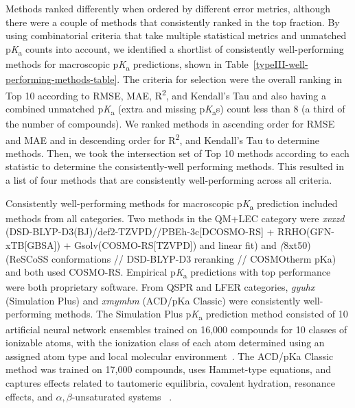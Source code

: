 \documentclass[9pt,lineno,final]{elife}
\newcommand{\pKa}{p\textit{K}\textsubscript{a}}
\begin{document}
Methods ranked differently when ordered by different error metrics, although there were a couple of methods that consistently ranked in the top fraction. 
By using combinatorial criteria that take multiple statistical metrics and unmatched \pKa{} counts into account, we identified a shortlist of consistently well-performing methods for macroscopic \pKa{} predictions, shown in Table~\ref{typeIII-well-performing-methods-table}. 
The criteria for selection were the overall ranking in Top 10 according to RMSE, MAE, R\textsuperscript{2}, and Kendall's Tau and also having a combined unmatched \pKa{} (extra and missing \pKa{}s) count less than 8 (a third of the number of compounds). We ranked methods in ascending order for RMSE and MAE and in descending order for R\textsuperscript{2}, and Kendall's Tau to determine methods. Then, we took the intersection set of Top 10 methods according to each statistic to determine the consistently-well performing methods.
This resulted in a list of four methods that are consistently well-performing across all criteria.

Consistently well-performing methods for macroscopic \pKa{} prediction included methods from all categories. 
Two methods in the QM+LEC category were \textit{xvxzd} (DSD-BLYP-D3(BJ)/def2-TZVPD//PBEh-3c[DCOSMO-RS] + RRHO(GFN-xTB[GBSA]) + Gsolv(COSMO-RS[TZVPD]) and linear fit) and \textit(8xt50) (ReSCoSS conformations // DSD-BLYP-D3 reranking // COSMOtherm pKa) and both used COSMO-RS. 
Empirical \pKa{} predictions with top performance were both proprietary software. 
From QSPR and LFER categories, \textit{gyuhx} (Simulation Plus) and \textit{xmymhm} (ACD/pKa Classic) were consistently well-performing methods. 
The Simulation Plus \pKa{} prediction method consisted of 10 artificial neural network ensembles trained on 16,000 compounds for 10 classes of ionizable atoms, with the ionization class of each atom determined using an assigned atom type and local molecular environment~\citep{simulation_plus_D3R_presentation}. 
The ACD/pKa Classic method was trained on 17,000 compounds, uses Hammet-type equations, and captures effects related to tautomeric equilibria, covalent hydration, resonance effects, and  $\alpha, \beta$-unsaturated systems ~\citep{ACD-pKa-classic}.
\end{document}
